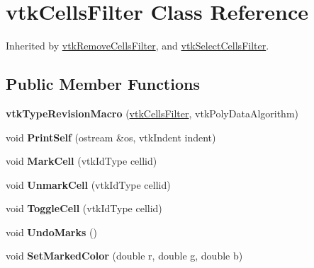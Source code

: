 \hypertarget{classvtkCellsFilter}{
\section{vtkCellsFilter Class Reference}
\label{classvtkCellsFilter}
}


Inherited by \hyperlink{classvtkRemoveCellsFilter}{vtkRemoveCellsFilter}, and \hyperlink{classvtkSelectCellsFilter}{vtkSelectCellsFilter}.\subsection*{Public Member Functions}
\begin{DoxyCompactItemize}
\item 
\hypertarget{classvtkCellsFilter_afcdc6df60fa20c76231f906bec08b927}{
{\bfseries vtkTypeRevisionMacro} (\hyperlink{classvtkCellsFilter}{vtkCellsFilter}, vtkPolyDataAlgorithm)}
\label{classvtkCellsFilter_afcdc6df60fa20c76231f906bec08b927}

\item 
\hypertarget{classvtkCellsFilter_aa9bc8fe52147217ca9d38d3d2d8757fe}{
void {\bfseries PrintSelf} (ostream \&os, vtkIndent indent)}
\label{classvtkCellsFilter_aa9bc8fe52147217ca9d38d3d2d8757fe}

\item 
\hypertarget{classvtkCellsFilter_ae2e35f27ef3dcffaec928132cef2a53d}{
void {\bfseries MarkCell} (vtkIdType cellid)}
\label{classvtkCellsFilter_ae2e35f27ef3dcffaec928132cef2a53d}

\item 
\hypertarget{classvtkCellsFilter_ac37c9a09305ab9283da51025e55d032c}{
void {\bfseries UnmarkCell} (vtkIdType cellid)}
\label{classvtkCellsFilter_ac37c9a09305ab9283da51025e55d032c}

\item 
\hypertarget{classvtkCellsFilter_a9baa86f2381eca30817bf1d84926255b}{
void {\bfseries ToggleCell} (vtkIdType cellid)}
\label{classvtkCellsFilter_a9baa86f2381eca30817bf1d84926255b}

\item 
\hypertarget{classvtkCellsFilter_a95fc0b0d36f7287ce9575a4a54ef5c58}{
void {\bfseries UndoMarks} ()}
\label{classvtkCellsFilter_a95fc0b0d36f7287ce9575a4a54ef5c58}

\item 
\hypertarget{classvtkCellsFilter_a988af256db7b304b5792bb506f04732c}{
void {\bfseries SetMarkedColor} (double r, double g, double b)}
\label{classvtkCellsFilter_a988af256db7b304b5792bb506f04732c}


\end{DoxyCompactItemize}
